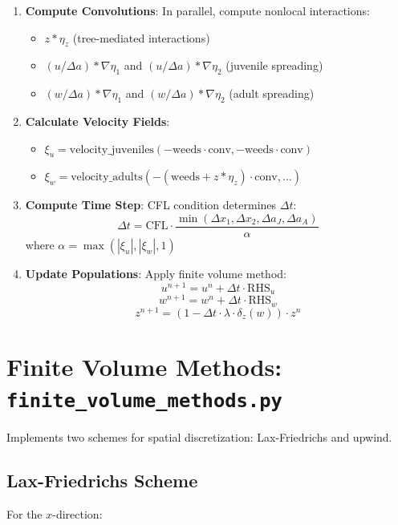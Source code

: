 \documentclass[12pt,a4paper]{report}
\begin{document}
\begin{enumerate}
    \item \textbf{Compute Convolutions}: In parallel, compute nonlocal interactions:
    \begin{itemize}
        \item $z * \eta_z$ (tree-mediated interactions)
        \item $(u/\Delta a) * \nabla\eta_1$ and $(u/\Delta a) * \nabla\eta_2$ (juvenile spreading)
        \item $(w/\Delta a) * \nabla\eta_1$ and $(w/\Delta a) * \nabla\eta_2$ (adult spreading)
    \end{itemize}
    
    \item \textbf{Calculate Velocity Fields}: 
    \begin{itemize}
        \item $\xi_u = \text{velocity\_juveniles}(-\text{weeds} \cdot \text{conv}, -\text{weeds} \cdot \text{conv})$
        \item $\xi_w = \text{velocity\_adults}(-(\text{weeds} + z*\eta_z) \cdot \text{conv}, \ldots)$
    \end{itemize}
    
    \item \textbf{Compute Time Step}: CFL condition determines $\Delta t$:
    \[\Delta t = \text{CFL} \cdot \frac{\min(\Delta x_1, \Delta x_2, \Delta a_J, \Delta a_A)}{\alpha}\]
    where $\alpha = \max(|\xi_u|, |\xi_w|, 1)$
    
    \item \textbf{Update Populations}: Apply finite volume method:
    \[u^{n+1} = u^n + \Delta t \cdot \text{RHS}_u\]
    \[w^{n+1} = w^n + \Delta t \cdot \text{RHS}_w\]
    \[z^{n+1} = (1 - \Delta t \cdot \lambda \cdot \delta_z(w)) \cdot z^n\]
\end{enumerate}

\section{Finite Volume Methods: \texttt{finite\_volume\_methods.py}}

Implements two schemes for spatial discretization: Lax-Friedrichs and upwind.

\subsection{Lax-Friedrichs Scheme}

For the $x$-direction:
\end{document}
